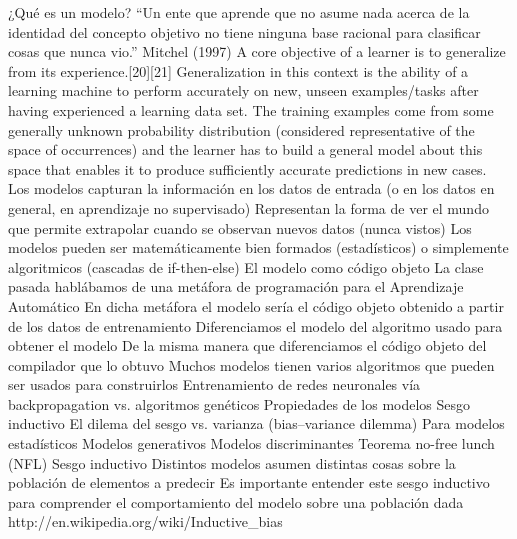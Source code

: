 ¿Qué es un modelo?
“Un ente que aprende que no asume nada acerca de la identidad del concepto objetivo no tiene ninguna base racional para clasificar cosas que nunca vio.”
Mitchel (1997)
A core objective of a learner is to generalize from its experience.[20][21] Generalization in this context is the ability of a learning machine to perform accurately on new,
unseen examples/tasks after having experienced a learning data set. The training examples come from some generally unknown probability distribution 
(considered representative of the space of occurrences) and the learner has to build a general model about this space that enables it to produce sufficiently accurate predictions in new cases.
Los modelos capturan la información en los datos de entrada (o en los datos en general, en aprendizaje no supervisado)
Representan la forma de ver el mundo que permite extrapolar cuando se observan nuevos datos (nunca vistos)
Los modelos pueden ser matemáticamente bien formados (estadísticos) o simplemente algoritmicos (cascadas de if-then-else)
El modelo como código objeto
La clase pasada hablábamos de una metáfora de programación para el Aprendizaje Automático
En dicha metáfora el modelo sería el código objeto obtenido a partir de los datos de entrenamiento
Diferenciamos el modelo del algoritmo usado para obtener el modelo
De la misma manera que diferenciamos el código objeto del compilador que lo obtuvo
Muchos modelos tienen varios algoritmos que pueden ser usados para construirlos
Entrenamiento de redes neuronales vía backpropagation vs. algoritmos genéticos
Propiedades de los modelos
Sesgo inductivo
El dilema del sesgo vs. varianza (bias–variance dilemma)
Para modelos estadísticos
Modelos generativos
Modelos discriminantes
Teorema no-free lunch (NFL)
Sesgo inductivo
Distintos modelos asumen distintas cosas sobre la población de elementos a predecir
Es importante entender este sesgo inductivo para comprender el comportamiento del modelo sobre una población dada
http://en.wikipedia.org/wiki/Inductive_bias


